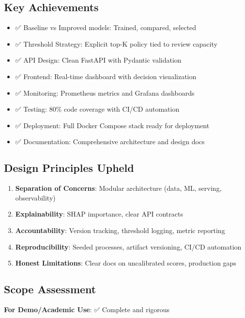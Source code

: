 \documentclass[12pt,a4paper]{article}
\begin{document}
\subsection{Key Achievements}

\begin{itemize}
    \item ✅ Baseline vs Improved models: Trained, compared, selected
    \item ✅ Threshold Strategy: Explicit top-K policy  tied to review capacity
    \item ✅ API Design: Clean FastAPI with Pydantic validation
    \item ✅ Frontend: Real-time dashboard with decision visualization
    \item ✅ Monitoring: Prometheus metrics and Grafana dashboards
    \item ✅ Testing: 80\% code coverage with CI/CD automation
    \item ✅ Deployment: Full Docker Compose stack ready for deployment
    \item ✅ Documentation: Comprehensive architecture and design docs
\end{itemize}

\subsection{Design Principles Upheld}

\begin{enumerate}
    \item \textbf{Separation of Concerns}: Modular architecture (data, ML, serving, observability)
    \item \textbf{Explainability}: SHAP importance, clear API contracts
    \item \textbf{Accountability}: Version tracking, threshold logging, metric reporting
    \item \textbf{Reproducibility}: Seeded processes, artifact versioning, CI/CD automation
    \item \textbf{Honest Limitations}: Clear docs on uncalibrated scores, production gaps
\end{enumerate}

\subsection{Scope Assessment}

\textbf{For Demo/Academic Use}: ✅ Complete and rigorous
\end{document}

